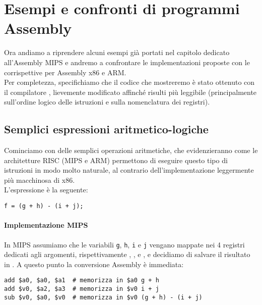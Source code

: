 \documentclass[class=book, crop=false, oneside]{standalone}
\begin{document}
\chapter{Esempi e confronti di programmi Assembly}
Ora andiamo a riprendere alcuni esempi già portati nel capitolo dedicato all'Assembly MIPS e andremo a confrontare le implementazioni proposte con le corrispettive per Assembly x86 e ARM.\\
Per completezza, specifichiamo che il codice che mostreremo è stato ottenuto con il compilatore , lievemente modificato affinché risulti più leggibile (principalmente sull'ordine logico delle istruzioni e sulla nomenclatura dei registri).

\section{Semplici espressioni aritmetico-logiche}
Cominciamo con delle semplici operazioni aritmetiche, che evidenzieranno come le architetture RISC (MIPS e ARM) permettono di eseguire questo tipo di istruzioni in modo molto naturale, al contrario dell'implementazione leggermente più macchinosa di x86.\\
L'espressione è la seguente:
\begin{verbatim}
f = (g + h) - (i + j);
\end{verbatim}

\subsubsection{Implementazione MIPS}
In MIPS assumiamo che le variabili \texttt{g}, \texttt{h}, \texttt{i} e \texttt{j} vengano mappate nei 4 registri dedicati agli argomenti, rispettivamente , ,  e , e decidiamo di salvare il risultato in . A questo punto la conversione Assembly è immediata:
\begin{verbatim}
add $a0, $a0, $a1  # memorizza in $a0 g + h
add $v0, $a2, $a3  # memorizza in $v0 i + j
sub $v0, $a0, $v0  # memorizza in $v0 (g + h) - (i + j)
\end{verbatim}
\end{document}
